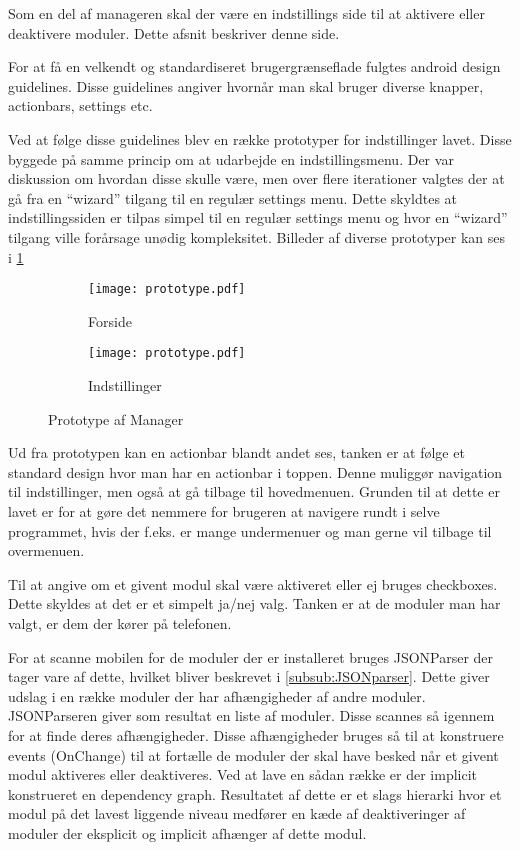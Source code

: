 Som en del af manageren skal der være en indstillings side til at aktivere eller deaktivere moduler. Dette afsnit beskriver denne side.

For at få en velkendt og standardiseret brugergrænseflade fulgtes android design guidelines.
Disse guidelines angiver hvornår man skal bruger diverse knapper, actionbars, settings etc.
\cite{androiddesign}

Ved at følge disse guidelines blev en række prototyper for indstillinger lavet.
Disse byggede på samme princip om at udarbejde en indstillingsmenu.
Der var diskussion om hvordan disse skulle være, men over flere iterationer valgtes der at gå fra en ``wizard'' tilgang til en regulær settings menu.
Dette skyldtes at indstillingssiden er tilpas simpel til en regulær settings menu og hvor en ``wizard'' tilgang ville forårsage unødig kompleksitet.
Billeder af diverse prototyper kan ses i \cref{fig:prototype-manager}

\begin{figure}[!h]
	\centering
	\begin{subfigure}[b]{0.45\textwidth}
			\texttt{[image: prototype.pdf]}
			\caption{Forside}
	\end{subfigure}
	\begin{subfigure}[b]{0.45\textwidth}
			\texttt{[image: prototype.pdf]}
			\caption{Indstillinger}
	\end{subfigure}
	\caption{Prototype af Manager}
	\label{fig:prototype-manager}
\end{figure}


Ud fra prototypen kan en actionbar blandt andet ses, tanken er at følge et standard design hvor man har en actionbar i toppen.
Denne muliggør navigation til indstillinger, men også at gå tilbage til hovedmenuen.
Grunden til at dette er lavet er for at gøre det nemmere for brugeren at navigere rundt i selve programmet, hvis der f.eks. er mange undermenuer og man gerne vil tilbage til overmenuen.

Til at angive om et givent modul skal være aktiveret eller ej bruges checkboxes.
Dette skyldes at det er et simpelt ja/nej valg. 
Tanken er at de moduler man har valgt, er dem der kører på telefonen.

For at scanne mobilen for de moduler der er installeret bruges JSONParser der tager vare af dette, hvilket bliver beskrevet i \cref{subsub:JSONparser}.
Dette giver udslag i en række moduler der har afhængigheder af andre moduler.
JSONParseren giver som resultat en liste af moduler. Disse scannes så igennem for at finde deres afhængigheder.
Disse afhængigheder bruges så til at konstruere events (OnChange) til at fortælle de moduler der skal have besked når et givent modul aktiveres eller deaktiveres.
Ved at lave en sådan række er der implicit konstrueret en dependency graph.
Resultatet af dette er et slags hierarki hvor et modul på det lavest liggende niveau medfører en kæde af deaktiveringer af moduler der eksplicit og implicit afhænger af dette modul.

